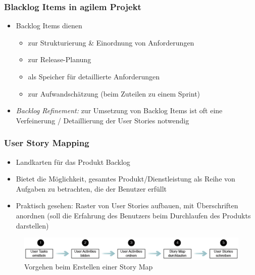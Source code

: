 \documentclass[a4paper]{article}
\begin{document}
			\subsubsection{Blacklog Items in agilem Projekt}
			
			\begin{itemize}
				\item Backlog Items dienen
					\begin{itemize}
						\item zur Strukturierung \& Einordnung von Anforderungen
						\item zur Release-Planung
						\item als Speicher für detaillierte Anforderungen
						\item zur Aufwandschätzung (beim Zuteilen zu einem Sprint)
					\end{itemize}
				\item \textit{Backlog Refinement:} zur Umsetzung von Backlog Items ist oft eine Verfeinerung / Detaillierung der User Stories notwendig
			\end{itemize}
		
			\subsubsection{User Story Mapping}
			
			\begin{itemize}
				\item Landkarten für das Produkt Backlog
				\item Bietet die Möglichkeit, gesamtes Produkt/Dienstleistung als Reihe von Aufgaben zu betrachten, die der Benutzer erfüllt
				\item Praktisch gesehen: Raster von User Stories aufbauen, mit Überschriften anordnen (soll die Erfahrung des Benutzers beim Durchlaufen des Produkts darstellen)
			\end{itemize}
			
			\begin{figure}[!htb]
				\centering
				\includegraphics[width=\textwidth]{img/re/05/story_mapping.png}
				\caption{Vorgehen beim Erstellen einer Story Map}
				\label{fig:re_story_mapping}
			\end{figure}
			
\newpage
			
\end{document}
